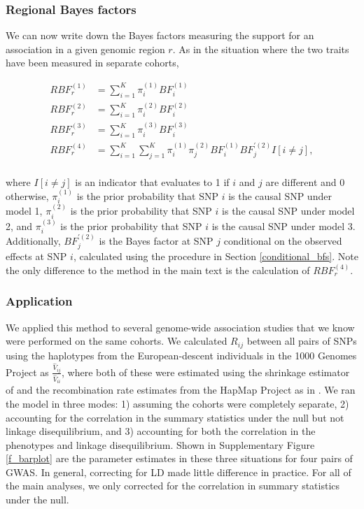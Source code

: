 \documentclass[11pt,titlepage]{article}
\begin{document}
\subsubsection{Regional Bayes factors}
We can now write down the Bayes factors measuring the support for an association in a given genomic region $r$. As in the situation where the two traits have been measured in separate cohorts,

\begin{align}
RBF_r^{(1)} &= \sum \limits_{i = 1}^{K} \pi_i^{(1)} BF_i^{(1)}\\
RBF_r^{(2)}  &= \sum \limits_{i = 1}^{K} \pi_i^{(2)} BF_i^{(2)} \\
RBF_r^{(3)}  &= \sum \limits_{i = 1}^{K} \pi_i^{(3)} BF_i^{(3)} \\
RBF_r^{(4)}  &= \sum \limits_{i = 1}^{K} \sum \limits_{j = 1}^K \pi_i^{(1)} \pi_j^{(2)}  BF_i^{(1)} BF_j^{\prime(2)} I[i \ne j ],\\
\end{align} 

\noindent where $I[i \ne j]$ is an indicator that evaluates to 1 if $i$ and $j$ are different and 0 otherwise,  $\pi_i^{(1)}$ is the prior probability that SNP $i$ is the causal SNP under model 1, $\pi_i^{(2)}$ is the prior probability that SNP $i$ is the causal SNP under model 2, and $\pi_i^{(3)}$ is the prior probability that SNP $i$ is the causal SNP under model 3. Additionally, $BF_j^{\prime(2)}$ is the Bayes factor at SNP $j$ conditional on the observed effects at SNP $i$, calculated using the procedure in Section \ref{conditional_bfs}. Note the only difference to the method in the main text is the calculation of $RBF_r^{(4)}$.

\subsubsection{Application}
We applied this method to several genome-wide association studies that we know were performed on the same cohorts. We calculated $R_{ij}$ between all pairs of SNPs using the haplotypes from the European-descent individuals in the 1000 Genomes Project as $\frac{\hat V_{ij}}{\hat V_{ii}}$, where both of these were estimated using the shrinkage estimator of \citet{Wen:2010aa} and the recombination rate estimates from the HapMap Project as in \citet{berisa2015approximately}. We ran the model in three modes: 1) assuming the cohorts were completely separate, 2) accounting for the correlation in the summary statistics under the null but not linkage disequilibrium, and 3) accounting for both the correlation in the phenotypes and linkage disequilibrium. Shown in Supplementary Figure \ref{f_barplot} are the parameter estimates in these three situations for four pairs of GWAS. In general, correcting for LD made little difference in practice. For all of the main analyses, we only corrected for the correlation in summary statistics under the null.
\end{document}
